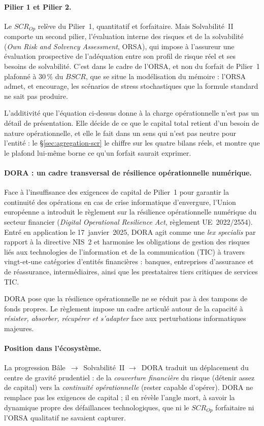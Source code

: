 \paragraph{Pilier 1 et Pilier 2.} Le $SCR_{Op}$ relève du Pilier~1, quantitatif et
forfaitaire. Mais Solvabilité~II comporte un second pilier, l'évaluation interne des
risques et de la solvabilité (\emph{Own Risk and Solvency Assessment}, ORSA), qui impose
à l'assureur une évaluation prospective de l'adéquation entre son profil de risque réel
et ses besoins de solvabilité. C'est dans le cadre de l'ORSA, et non du forfait de
Pilier~1 plafonné à $30\,\%$ du $BSCR$, que se situe la modélisation du
mémoire : l'ORSA admet, et encourage, les scénarios de stress stochastiques que la formule
standard ne sait pas produire.

L'additivité que l'équation ci-dessus donne à la charge opérationnelle n'est pas un détail
de présentation. Elle décide de ce que le capital total retient d'un besoin de nature
opérationnelle, et elle le fait dans un sens qui n'est pas neutre pour l'entité : le
\S\ref{sec:agregation-scr} le chiffre sur les quatre bilans réels, et montre que le plafond
lui-même borne ce qu'un forfait saurait exprimer.

\paragraph{DORA : un cadre transversal de résilience opérationnelle numérique.}
Face à l'insuffisance des exigences de capital de Pilier~1 pour garantir la continuité
des opérations en cas de crise informatique d'envergure, l'Union européenne a introduit
le règlement sur la résilience opérationnelle numérique du secteur financier
(\emph{Digital Operational Resilience Act}, règlement UE~2022/2554). Entré en application
le 17~janvier~2025, DORA agit comme une \emph{lex specialis} par rapport à la directive
NIS~2 et harmonise les obligations de gestion des risques liés aux technologies de
l'information et de la communication (TIC) à travers vingt-et-une catégories
d'entités financières : banques, entreprises d'assurance et de réassurance,
intermédiaires, ainsi que les prestataires tiers critiques de services TIC.

DORA pose que la résilience opérationnelle ne se réduit pas à des tampons de fonds propres.
Le règlement impose un cadre articulé autour de la capacité à \emph{résister, absorber,
récupérer et s'adapter} face aux perturbations informatiques majeures.

\paragraph{Position dans l'écosystème.} La progression Bâle~$\rightarrow$~Solvabilité~II
$\rightarrow$~DORA traduit un déplacement du centre de gravité prudentiel : de la
\emph{couverture financière} du risque (détenir assez de capital) vers la \emph{continuité
opérationnelle} (rester capable d'opérer). DORA ne remplace pas les exigences de capital ;
il en révèle l'angle mort, à savoir la dynamique propre des défaillances technologiques,
que ni le $SCR_{Op}$ forfaitaire ni l'ORSA qualitatif ne savaient capturer.

